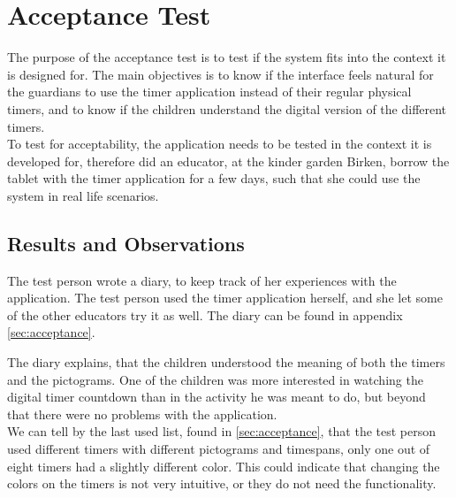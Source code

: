 \section{Acceptance Test}
\label{sec:accept_test}
The purpose of the acceptance test \cite{misc:designInterSys} is to test if the system fits into the context it is designed for. 
The main objectives is to know if the interface feels natural for the guardians to use the timer application instead of their regular physical timers, and to know if the children understand the digital version of the different timers.\\

To test for acceptability, the application needs to be tested in the context it is developed for, therefore did an educator, at the kinder garden Birken, borrow the tablet with the timer application for a few days, such that she could use the system in real life scenarios. 

\subsection{Results and Observations}
The test person wrote a diary, to keep track of her experiences with the application. The test person used the timer application herself, and she let some of the other educators try it as well. The diary can be found in appendix \ref{sec:acceptance}.

The diary explains, that the children understood the meaning of both the timers and the pictograms. One of the children was more interested in watching the digital timer countdown than in the activity he was meant to do, but beyond that there were no problems with the application.\\

We can tell by the last used list, found in \autoref{sec:acceptance}, that the test person used different timers with different pictograms and timespans, only one out of eight timers had a slightly different color. This could indicate that changing the colors on the timers is not very intuitive, or they do not need the functionality.